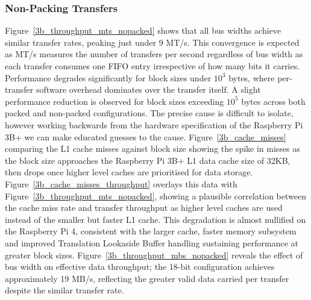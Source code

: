 \documentclass[final]{cmpreport}
\begin{document}
\subsubsection{Non-Packing Transfers}
Figure~\ref{3b_throughput_mts_nopacked} shows that all bus widths achieve similar transfer rates, peaking just under 9 MT/s. This convergence is expected as MT/s measures the number of transfers per second regardless of bus width as each transfer consumes one FIFO entry irrespective of how many bits it carries. Performance degrades significantly for block sizes under $10^3$ bytes, where per-transfer software overhead dominates over the transfer itself. A slight performance reduction is observed for block sizes exceeding $10^5$ bytes across both packed and non-packed configurations. The precise cause is difficult to isolate, however working backwards from the hardware specification of the Raspberry Pi 3B+ we can make educated guesses to the cause. Figure~\ref{3b_cache_misses} comparing the L1 cache misses against block size showing the spike in misses as the block size approaches the Raspberry Pi 3B+ L1 data cache size of 32KB, then drops once higher level caches are prioritised for data storage. Figure~\ref{3b_cache_misses_throughput} overlays this data with Figure~\ref{3b_throughput_mts_nopacked}, showing a plausible correlation between the cache miss rate and transfer throughput as higher level caches are used instead of the smaller but faster L1 cache. This degradation is almost nullified on the Raspberry Pi 4, consistent with the larger cache, faster memory subsystem and improved Translation Lookaside Buffer handling sustaining performance at greater block sizes. Figure~\ref{3b_throughput_mbs_nopacked} reveals the effect of bus width on effective data throughput; the 18-bit configuration achieves approximately 19 MB/s, reflecting the greater valid data carried per transfer despite the similar transfer rate.

\end{document}
